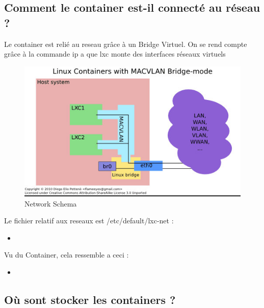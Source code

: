 \documentclass[10pt,a4paper]{article}
\newcommand{\insertcode}[2]{\begin{itemize}\item[]\end{itemize}}
\begin{document}
\subsection{Comment le container est-il connecté au réseau ? }
Le container est relié au reseau grâce à un Bridge Virtuel.
On se rend compte grâce à la commande ip a que lxc monte des interfaces réseaux virtuels 
  \begin{figure}[h!]
\centering
\includegraphics[scale=0.50]{screen/1.jpg}
\caption{Network Schema}
\label{fig:net }
\end{figure}
Le fichier relatif aux reseaux est /etc/default/lxc-net :
\insertcode{commande/8.txt}{lxc-net default}

Vu du Container, cela ressemble a ceci : 
\insertcode{commande/9.txt}{Configuration Réseau  }

\subsection{Où sont stocker les containers ?  }
\end{document}
